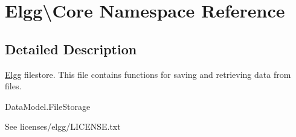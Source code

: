 \hypertarget{namespace_elgg_1_1_core}{}\section{Elgg\textbackslash{}Core Namespace Reference}
\label{namespace_elgg_1_1_core}


\subsection{Detailed Description}
\hyperlink{namespace_elgg}{Elgg} filestore. This file contains functions for saving and retrieving data from files.

Data\+Model.\+File\+Storage

See licenses/elgg/\+L\+I\+C\+E\+N\+S\+E.\+txt 